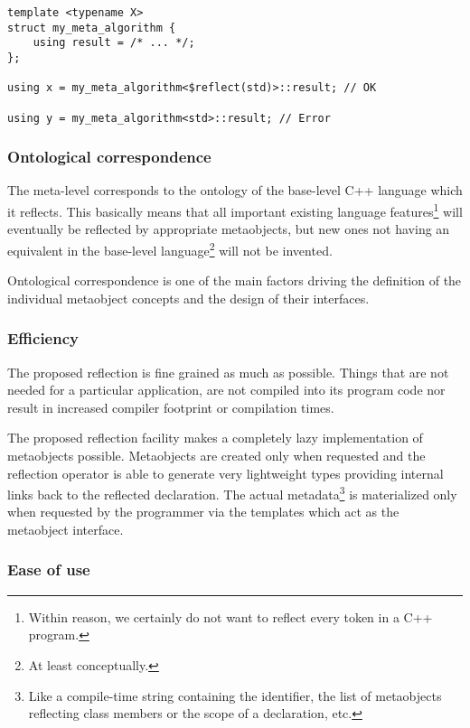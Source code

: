 \begin{verbatim}
template <typename X>
struct my_meta_algorithm {
	using result = /* ... */;
};

using x = my_meta_algorithm<$reflect(std)>::result; // OK

using y = my_meta_algorithm<std>::result; // Error

\end{verbatim}

\subsubsection{Ontological correspondence}
\label{design-onto-corr}

The meta-level 
corresponds to the ontology of the base-level C++ language
which it reflects. This basically means that all important existing language
features\footnote{Within reason, we certainly do not want to reflect every token
in a C++ program.} will eventually be reflected by appropriate metaobjects,
but new ones not having an equivalent in the base-level language\footnote{At least
conceptually.} will not be invented.

Ontological correspondence is one of the main factors driving the definition of the
individual metaobject concepts and the design of their interfaces.


\subsubsection{Efficiency}
\label{design-efficiency}

The proposed reflection is fine grained as much as possible.
Things that are not needed for a particular application,
are not compiled into its program code nor result in
increased compiler footprint or compilation times.

The proposed reflection facility makes a completely lazy implementation of
metaobjects possible. Metaobjects are created only when requested and
the reflection operator is able to generate very
lightweight types providing internal links back to the reflected declaration.
The actual
metadata\footnote{Like a compile-time string containing the identifier,
the list of metaobjects reflecting class members or the scope of a declaration,
etc.} is materialized only when requested by the programmer via the
templates which act as the metaobject interface.

\subsubsection{Ease of use}
\label{design-ease-of-use}

